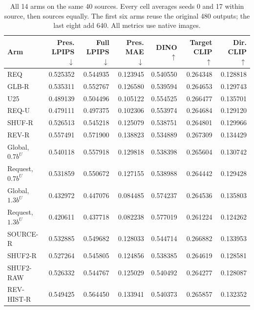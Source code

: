 \begin{table}[!t]
\centering\footnotesize
\caption{All 14 arms on the same 40 sources. Every cell averages seeds 0 and 17 within source, then sources equally. The first six arms reuse the original 480 outputs; the last eight add 640. All metrics use native images.}
\label{tab:r89-means}
\setlength{\tabcolsep}{5pt}
\begin{tabular}{lrrrrrr}
\toprule
Arm & Pres. LPIPS $\downarrow$ & Full LPIPS $\downarrow$ & Pres. MAE $\downarrow$ & DINO $\uparrow$ & Target CLIP $\uparrow$ & Dir. CLIP $\uparrow$ \\
\midrule
REQ & 0.525352 & 0.544935 & 0.123945 & 0.540550 & 0.264348 & 0.128818 \\
GLB-R & 0.535311 & 0.552767 & 0.126580 & 0.539594 & 0.264653 & 0.129743 \\
U25 & 0.489139 & 0.504496 & 0.105122 & 0.554525 & 0.266477 & 0.135701 \\
REQ-U & 0.479111 & 0.497375 & 0.102306 & 0.553974 & 0.264684 & 0.129120 \\
SHUF-R & 0.526513 & 0.545218 & 0.125079 & 0.538751 & 0.264801 & 0.129966 \\
REV-R & 0.557491 & 0.571900 & 0.138823 & 0.534889 & 0.267309 & 0.134429 \\
\midrule
Global, $0.7b^U$ & 0.540118 & 0.557918 & 0.129818 & 0.538398 & 0.265604 & 0.130742 \\
Request, $0.7b^U$ & 0.531859 & 0.550672 & 0.127155 & 0.538988 & 0.264442 & 0.129428 \\
Global, $1.3b^U$ & 0.432972 & 0.447076 & 0.084485 & 0.574237 & 0.264536 & 0.135803 \\
Request, $1.3b^U$ & 0.420611 & 0.437718 & 0.082238 & 0.577019 & 0.261224 & 0.124262 \\
SOURCE-R & 0.532885 & 0.549682 & 0.128033 & 0.544714 & 0.266882 & 0.133953 \\
SHUF2-R & 0.527264 & 0.545805 & 0.124856 & 0.538385 & 0.264619 & 0.128581 \\
SHUF2-RAW & 0.526332 & 0.544767 & 0.125029 & 0.540492 & 0.264277 & 0.128087 \\
REV-HIST-R & 0.549425 & 0.564450 & 0.133941 & 0.540373 & 0.265857 & 0.132352 \\
\bottomrule
\end{tabular}
\end{table}
